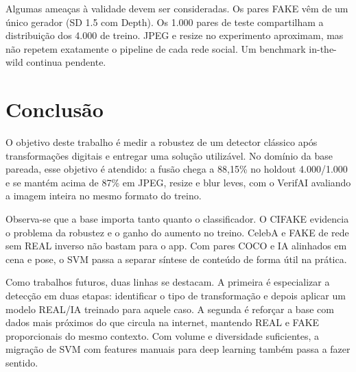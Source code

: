 \documentclass[12pt]{article}
\begin{document}
Algumas ameaças à validade devem ser consideradas. Os pares FAKE vêm de um único gerador (SD 1.5 com Depth). Os 1{.}000 pares de teste compartilham a distribuição dos 4{.}000 de treino. JPEG e resize no experimento aproximam, mas não repetem exatamente o pipeline de cada rede social. Um benchmark in-the-wild continua pendente.

\section{Conclusão}
\label{sec:conclusao}

O objetivo deste trabalho é medir a robustez de um detector clássico após transformações digitais e entregar uma solução utilizável. No domínio da base pareada, esse objetivo é atendido: a fusão chega a 88,15\% no holdout 4{.}000/1{.}000 e se mantém acima de 87\% em JPEG, resize e blur leves, com o VerifAI avaliando a imagem inteira no mesmo formato do treino.

Observa-se que a base importa tanto quanto o classificador. O CIFAKE evidencia o problema da robustez e o ganho do aumento no treino. CelebA e FAKE de rede sem REAL inverso não bastam para o app. Com pares COCO e IA alinhados em cena e pose, o SVM passa a separar síntese de conteúdo de forma útil na prática.

Como trabalhos futuros, duas linhas se destacam. A primeira é especializar a detecção em duas etapas: identificar o tipo de transformação e depois aplicar um modelo REAL/IA treinado para aquele caso. A segunda é reforçar a base com dados mais próximos do que circula na internet, mantendo REAL e FAKE proporcionais do mesmo contexto. Com volume e diversidade suficientes, a migração de SVM com features manuais para deep learning também passa a fazer sentido.



\end{document}
